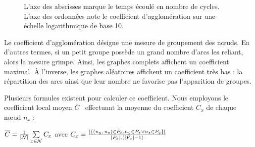 \begin{figure}
  \centering
  \hspace{10pt}
  \caption[Coefficient d'agglomération]{\label{net:fig:clustering}L'axe des
    abscisses marque le temps écoulé en nombre de cycles. L'axe des ordonnées
    note le coefficient d'agglomération sur une échelle logarithmique de base
    10.}
\end{figure}

Le coefficient d'agglomération désigne une mesure de groupement des nœuds. En
d'autres termes, si un petit groupe possède un grand nombre d'arcs les reliant,
alors la mesure grimpe. Ainsi, les graphes complets affichent un coefficient
maximal. À l'inverse, les graphes aléatoires affichent un coefficient très bas :
la répartition des arcs ainsi que leur nombre ne favorise pas l'apparition de
groupes.

Plusieurs formules existent pour calculer ce coefficient. Nous employons le
coefficient local moyen $\overline{C}$~\cite{watts1998collective} effectuant la
moyenne du coefficient $C_x$ de chaque nœud $n_x$ :
\begin{center}
  $\overline{C} = {1\over |\mathcal{N}|}\sum\limits_{x\in\mathcal{N}}C_x$ \hfill
  avec
  $C_x = {|\{ (n_y,\,n_z) \in P_x, n_y \in P_z \vee n_z \in P_y \}|\over
    |P_x|.(|P_x|-1)}$
\end{center}

